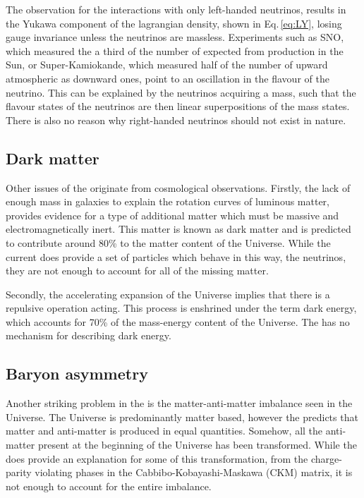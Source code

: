 The observation for the interactions with only left-handed neutrinos, results in the Yukawa component of the lagrangian density, shown in Eq.\,\ref{eq:LY}, losing gauge invariance unless the neutrinos are massless.
Experiments such as SNO, which measured the a third of the number of \nue{} expected from production in the Sun, or Super-Kamiokande, which measured half of the number of upward atmospheric \numu{} as downward ones, point to an oscillation in the flavour of the neutrino.
This can be explained by the neutrinos acquiring a mass, such that the flavour states of the neutrinos are then linear superpositions of the mass states.
There is also no reason why right-handed neutrinos should not exist in nature.

\subsection{Dark matter} %
\label{sub:dark_matter}

Other issues of the \SM{} originate from cosmological observations.
Firstly, the lack of enough mass in galaxies to explain the rotation curves of luminous matter, provides evidence for a type of additional matter which must be massive and electromagnetically inert.
This matter is known as dark matter and is predicted to contribute around 80\% to the matter content of the Universe. 
While the current \SM{} does provide a set of particles which behave in this way, the neutrinos, they are not enough to account for all of the missing matter.

Secondly, the accelerating expansion of the Universe implies that there is a repulsive operation acting.
This process is enshrined under the term dark energy, which accounts for 70\% of the mass-energy content of the Universe.
The \SM{} has no mechanism for describing dark energy.

\subsection{Baryon asymmetry} %
\label{sub:baryon_asymmetry}

Another striking problem in the \SM{} is the matter-anti-matter imbalance seen in the Universe.
The Universe is predominantly matter based, however the \SM{} predicts that matter and anti-matter is produced in equal quantities.
Somehow, all the anti-matter present at the beginning of the Universe has been transformed.
While the \SM{} does provide an explanation for some of this transformation, from the charge-parity violating phases in the Cabbibo-Kobayashi-Maskawa (CKM) matrix, it is not enough to account for the entire imbalance.


